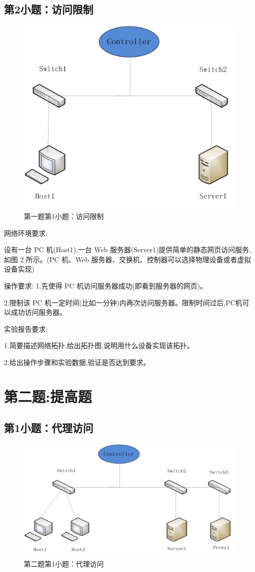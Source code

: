 \documentclass[format=draft,language=chinese,category=SDN]{hustreport}
\begin{document}
\subsection{第2小题：访问限制}\label{sec:Q1_2}

\begin{figure}[!h]
\centering
\includegraphics[width=.618\textwidth]{fig/1_2-0.png}
\caption{第一题第1小题：访问限制}\label{fig:Q1_2-0}
\end{figure}

网络环境要求:

设有一台 PC 机(Host1),一台 Web 服务器(Server1)提供简单的静态网页访问服务,如图 2 所示。(PC 机、Web 服务器、交换机、控制器可以选择物理设备或者虚拟设备实现)

操作要求:
1.先使得 PC 机访问服务器成功(即看到服务器的网页)。

2.限制该 PC 机一定时间(比如一分钟)内再次访问服务器。限制时间过后,PC机可以成功访问服务器。

实验报告要求:

1.简要描述网络拓扑,给出拓扑图,说明用什么设备实现该拓扑。

2.给出操作步骤和实验数据,验证是否达到要求。

\section{第二题:提高题}\label{sec:Q2}
\subsection{第1小题：代理访问}\label{sec:Q2_1}

\begin{figure}[!h]
\centering
\includegraphics[width=.618\textwidth]{fig/2_1-0.png}
\caption{第二题第1小题：代理访问}\label{fig:Q2_1-0}
\end{figure}
\end{document}
